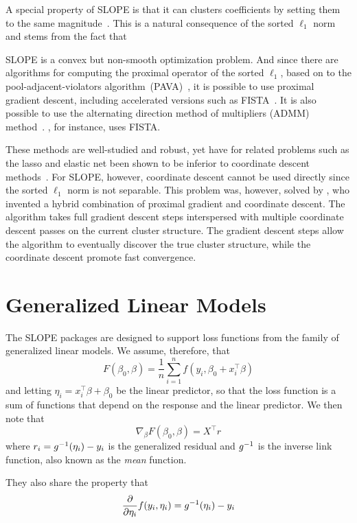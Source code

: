 \documentclass[article]{jss}
\begin{document}
A special property of SLOPE is that it can clusters coefficients by
setting them to the same magnitude~\citep{figueiredo2016,bogdan2022}. This is a natural
consequence of the sorted \(\ell_1\) norm and stems from the fact that

SLOPE is a convex but non-smooth optimization problem. And since there are
algorithms for computing the proximal operator of the sorted \(\ell_1\), based
on to the pool-adjacent-violators algorithm~(PAVA)~\citep{barlow1972}, it is
possible to use proximal gradient descent, including accelerated versions such
as FISTA~\citep{beck2009}. It is also possible to use the alternating direction
method of multipliers (ADMM) method~\citep{boyd2010}. \citet{bogdan2015}, for
instance, uses FISTA.

These methods are well-studied and robust, yet have for related problems such
as the lasso and elastic net been shown to be inferior to coordinate descent
methods~\citep{friedman2007,friedman2010}. For SLOPE, however, coordinate
descent cannot be used directly since the sorted \(\ell_1\) norm is not
separable. This problem was, however, solved by \citet{larsson2023}, who invented a
hybrid combination of proximal gradient and coordinate descent. The
algorithm takes full gradient descent steps interspersed with multiple
coordinate descent passes on the current cluster structure. The gradient descent
steps allow the algorithm to eventually discover the true cluster structure,
while the coordinate descent promote fast convergence.

\section{Generalized Linear Models}

The SLOPE packages are designed to support loss functions
from the family of generalized linear models. We assume, therefore, that
\[
  F(\beta_0, \beta) = \frac{1}{n} \sum_{i=1}^n f(y_i, \beta_0 + x_i^\intercal \beta)
\]
and letting \(\eta_i = x_i^\intercal \beta + \beta_0\) be the
linear predictor, so that the loss function is a sum of functions that depend
on the response and the linear predictor. We then note that
\[
  \nabla_\beta F(\beta_0,\beta) = X^\intercal r
\]
where \(r_i = g^{-1}(\eta_i) - y_i\) is the generalized residual and
\(g^{-1}\) is the inverse link function, also known as the \emph{mean}
function.

They also share the property that
\[
  \frac{\partial}{\partial \eta_i} f(y_i, \eta_i) = g^{-1}(\eta_i) - y_i
\]
\end{document}
